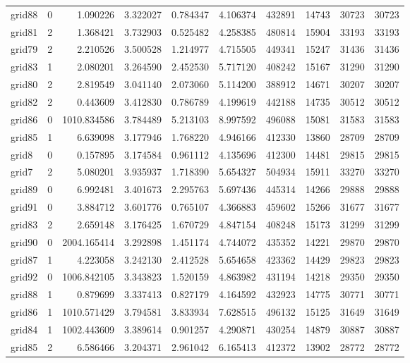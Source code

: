 \documentclass[../../../thesis.tex]{subfiles}
\begin{document}
\begin{longtable}{|l|r|r|r|r|r|r|r|r|r|}
grid88 & 0 & 1.090226 & 3.322027 & 0.784347 & 4.106374 & 432891 & 14743 & 30723 & 30723 \\
grid81 & 2 & 1.368421 & 3.732903 & 0.525482 & 4.258385 & 480814 & 15904 & 33193 & 33193 \\
grid79 & 2 & 2.210526 & 3.500528 & 1.214977 & 4.715505 & 449341 & 15247 & 31436 & 31436 \\
grid83 & 1 & 2.080201 & 3.264590 & 2.452530 & 5.717120 & 408242 & 15167 & 31290 & 31290 \\
grid80 & 2 & 2.819549 & 3.041140 & 2.073060 & 5.114200 & 388912 & 14671 & 30207 & 30207 \\
grid82 & 2 & 0.443609 & 3.412830 & 0.786789 & 4.199619 & 442188 & 14735 & 30512 & 30512 \\
grid86 & 0 & 1010.834586 & 3.784489 & 5.213103 & 8.997592 & 496088 & 15081 & 31583 & 31583 \\
grid85 & 1 & 6.639098 & 3.177946 & 1.768220 & 4.946166 & 412330 & 13860 & 28709 & 28709 \\
grid8 & 0 & 0.157895 & 3.174584 & 0.961112 & 4.135696 & 412300 & 14481 & 29815 & 29815 \\
grid7 & 2 & 5.080201 & 3.935937 & 1.718390 & 5.654327 & 504934 & 15911 & 33270 & 33270 \\
grid89 & 0 & 6.992481 & 3.401673 & 2.295763 & 5.697436 & 445314 & 14266 & 29888 & 29888 \\
grid91 & 0 & 3.884712 & 3.601776 & 0.765107 & 4.366883 & 459602 & 15266 & 31677 & 31677 \\
grid83 & 2 & 2.659148 & 3.176425 & 1.670729 & 4.847154 & 408248 & 15173 & 31299 & 31299 \\
grid90 & 0 & 2004.165414 & 3.292898 & 1.451174 & 4.744072 & 435352 & 14221 & 29870 & 29870 \\
grid87 & 1 & 4.223058 & 3.242130 & 2.412528 & 5.654658 & 423362 & 14429 & 29823 & 29823 \\
grid92 & 0 & 1006.842105 & 3.343823 & 1.520159 & 4.863982 & 431194 & 14218 & 29350 & 29350 \\
grid88 & 1 & 0.879699 & 3.337413 & 0.827179 & 4.164592 & 432923 & 14775 & 30771 & 30771 \\
grid86 & 1 & 1010.571429 & 3.794581 & 3.833934 & 7.628515 & 496132 & 15125 & 31649 & 31649 \\
grid84 & 1 & 1002.443609 & 3.389614 & 0.901257 & 4.290871 & 430254 & 14879 & 30887 & 30887 \\
grid85 & 2 & 6.586466 & 3.204371 & 2.961042 & 6.165413 & 412372 & 13902 & 28772 & 28772 \\

\end{longtable}
\end{document}

